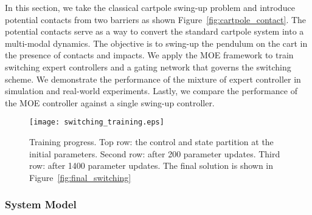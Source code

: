 In this section, we take the classical cartpole swing-up problem and introduce
potential contacts from two barriers as shown Figure~\ref{fig:cartpole_contact}. 
%
The potential contacts serve as a way to convert the standard cartpole system
into a multi-modal dynamics.
%
The objective is to swing-up the pendulum on the cart in the presence of
contacts and impacts.
%
We apply the MOE framework to train switching expert controllers and a gating
network that governs the switching scheme.
%
We demonstrate the performance of the mixture of expert controller in
simulation and real-world experiments.
%
Lastly, we compare the performance of the MOE controller against
a single swing-up controller. 
\begin{figure}[H]
    \centering
    \texttt{[image: switching\_training.eps]}
    \caption{Training progress. Top row: the control and state partition at the
    initial parameters. Second row: after 200 parameter updates. Third row:
    after 1400 parameter updates. The final solution is shown in
    Figure~\ref{fig:final_switching}}
    \label{fig:switching_training}
\end{figure} 

\subsubsection{System Model}
\label{sssec:cartpole_model}

